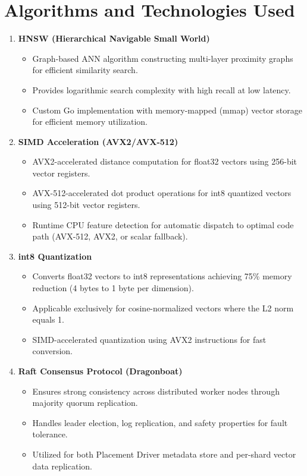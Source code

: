 \vspace{2cm}
\section{Algorithms and Technologies Used}
\begin{enumerate}
    \item \textbf{HNSW (Hierarchical Navigable Small World)}
    \begin{itemize}
        \item Graph-based ANN algorithm constructing multi-layer proximity graphs for efficient similarity search.
        \item Provides logarithmic search complexity with high recall at low latency.
        \item Custom Go implementation with memory-mapped (mmap) vector storage for efficient memory utilization.
    \end{itemize}

    \item \textbf{SIMD Acceleration (AVX2/AVX-512)}
    \begin{itemize}
        \item AVX2-accelerated distance computation for float32 vectors using 256-bit vector registers.
        \item AVX-512-accelerated dot product operations for int8 quantized vectors using 512-bit vector registers.
        \item Runtime CPU feature detection for automatic dispatch to optimal code path (AVX-512, AVX2, or scalar fallback).
    \end{itemize}

    \item \textbf{int8 Quantization}
    \begin{itemize}
        \item Converts float32 vectors to int8 representations achieving 75\% memory reduction (4 bytes to 1 byte per dimension).
        \item Applicable exclusively for cosine-normalized vectors where the L2 norm equals 1.
        \item SIMD-accelerated quantization using AVX2 instructions for fast conversion.
    \end{itemize}

    \item \textbf{Raft Consensus Protocol (Dragonboat)}
    \begin{itemize}
        \item Ensures strong consistency across distributed worker nodes through majority quorum replication.
        \item Handles leader election, log replication, and safety properties for fault tolerance.
        \item Utilized for both Placement Driver metadata store and per-shard vector data replication.
    \end{itemize}


\end{enumerate}
